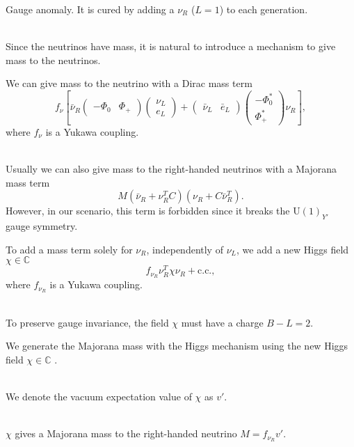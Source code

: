 \documentclass[14pt]{beamer}
\begin{document}
\begin{frame}

Gauge anomaly. It is cured by adding a $\nu_R$ ($L=1$) to each generation. \\~\

Since the neutrinos have mass, it is natural to introduce a mechanism to give mass to the neutrinos.
\end{frame}


\begin{frame}
We can give mass to the neutrino with a Dirac mass term 
$$ f_{\nu} \left[\bar{\nu}_R \begin{pmatrix}-\Phi_0 & \Phi_+\end{pmatrix}\begin{pmatrix}
	\nu_L \\
	e_L
\end{pmatrix} + \begin{pmatrix}\bar{\nu}_L & \bar{e}_L\end{pmatrix}
\begin{pmatrix}
	-\Phi^*_0 \\
	\Phi^*_+
\end{pmatrix}\nu_R\right], $$
where $f_{\nu}$ is a Yukawa coupling.\\~\

\end{frame}


\begin{frame}
Usually we can also give mass to the right-handed neutrinos with a Majorana mass term
$$	M(\bar{\nu}_R+{\nu}^T_RC)(\nu_R+C\bar{\nu}_R^T). $$
However, in our scenario, this term is forbidden since it breaks the U$(1)_{Y'}$ gauge symmetry.
\end{frame}


\begin{frame}
To add a mass term solely for $\nu_R$, independently of $\nu_L$, we add a new Higgs field $\chi\in\mathbb{C}$
$$f_{\nu_R} \nu_R^T \chi \nu_R + \text{c.c.},$$
where $f_{\nu_R}$ is a Yukawa coupling. \\~\

To preserve gauge invariance, the field $\chi$ must have a charge $B-L=2$.
\end{frame}

\begin{frame}
We generate the Majorana mass with the Higgs mechanism using the new Higgs field $\chi \in \mathbb{C}$ .\\~\

We denote the vacuum expectation value of $\chi$ as $v'$. \\~\

$\chi$ gives a Majorana mass to the right-handed neutrino $M = f_{\nu_R} v'$.  \\~\

\end{frame}
\end{document}
